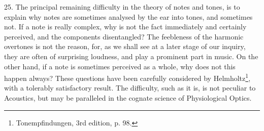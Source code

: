 25. The principal remaining difficulty in the theory of notes and tones, is to
explain why notes are sometimes analysed by the ear into tones, and sometimes
not. If a note is really complex, why is not the fact immediately and certainly
perceived, and the components disentangled?  The feebleness of the harmonic
overtones is not the reason, for, as we shall see at a later stage of our
inquiry, they are often of surprising loudness, and play a prominent part in
music. On the other hand, if a note is sometimes perceived as a whole, why does
not this happen always?  These questions have been carefully considered by
Helmholtz\footnote{Tonempfindungen, 3rd edition, p. 98.}, with a tolerably
satisfactory result. The difficulty, such as it is, is not peculiar to
Acoustics, but may be paralleled in the cognate science of Physiological
Optics.


